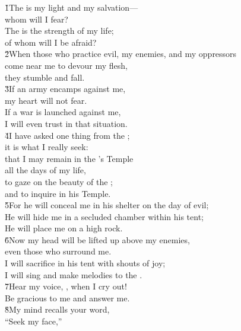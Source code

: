 \begin{poetry}
\poeml \v{1}The  is my light and my salvation--- \\
\poemll    whom will I fear? \\
\poeml The  is the strength of my life; \\
\poemll    of whom will I be afraid? \\
\poeml \v{2}When those who practice evil, my enemies, and my oppressors \\
\poemll    come near me to devour my flesh, \\
\poemlll       they stumble and fall. \\
\poeml \v{3}If an army encamps against me, \\
\poemll    my heart will not fear. \\
\poeml If a war is launched against me, \\
\poemll    I will even trust in that situation. \\
\poeml \v{4}I have asked one thing from the ; \\
\poemll    it is what I really seek: \\
\poeml that I may remain in the 's Temple \\
\poemll    all the days of my life, \\
\poeml to gaze on the beauty of the ; \\
\poemll    and to inquire in his Temple. \\
\poeml \v{5}For he will conceal me in his shelter on the day of evil; \\
\poemll    He will hide me in a secluded chamber within his tent; \\
\poemlll       He will place me on a high rock. \\
\poeml \v{6}Now my head will be lifted up above my enemies, \\
\poemll    even those who surround me. \\
\poeml I will sacrifice in his tent with shouts of joy; \\
\poemll    I will sing and make melodies to the . \\
\poeml \v{7}Hear my voice, , when I cry out! \\
\poemll    Be gracious to me and answer me. \\
\poeml \v{8}My mind recalls your word, \\
\poemll    ``Seek my face,'' \\

\end{poetry}
